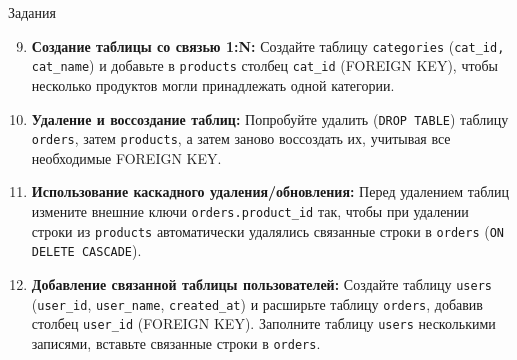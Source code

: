 \documentclass{beamer}
\begin{document}
\begin{frame}{Задания}
	\begin{enumerate}
		\setcounter{enumi}{8}
		\item \textbf{Создание таблицы со связью 1:N:}
		      Создайте таблицу \texttt{categories} (\texttt{cat\_id, cat\_name}) и добавьте в \texttt{products} столбец \texttt{cat\_id} (FOREIGN KEY), чтобы несколько продуктов могли принадлежать одной категории.

		\item \textbf{Удаление и воссоздание таблиц:}
		      Попробуйте удалить (\texttt{DROP TABLE}) таблицу \texttt{orders}, затем \texttt{products}, а затем заново воссоздать их, учитывая все необходимые FOREIGN KEY.

		\item \textbf{Использование каскадного удаления/обновления:}
		      Перед удалением таблиц измените внешние ключи \texttt{orders.product\_id} так, чтобы при удалении строки из \texttt{products} автоматически удалялись связанные строки в \texttt{orders} (\texttt{ON DELETE CASCADE}).

		\item \textbf{Добавление связанной таблицы пользователей:}
		      Создайте таблицу \texttt{users} (\texttt{user\_id}, \texttt{user\_name}, \texttt{created\_at}) и расширьте таблицу \texttt{orders}, добавив столбец \texttt{user\_id} (FOREIGN KEY). Заполните таблицу \texttt{users} несколькими записями, вставьте связанные строки в \texttt{orders}.
	\end{enumerate}
\end{frame}
\end{document}
